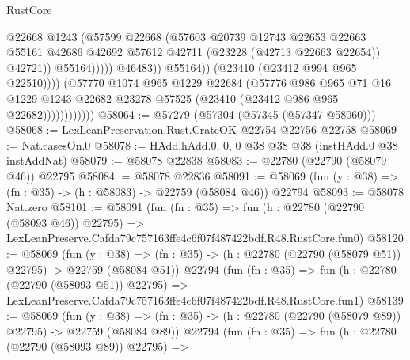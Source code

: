 \begin{lexlean}{RustCore}
\begin{coremodule}
                                          @22668
                                          @1243
                                          (@57599
                                            @22668
                                            (@57603
                                              @20739
                                              @12743
                                              @22653
                                              @22663
                                              @55161
                                              @42686
                                              @42692
                                              @57612
                                              @42711
                                              (@23228 (@42713 @22663 @22654))
                                              @42721))
                                          @55164)))))
                                @46483))
                            @55164))
                        (@23410 (@23412 @994 @965 @22510))))
                    (@57770
                      @1074
                      @965
                      @1229
                      @22684
                      (@57776
                        @986
                        @965
                        @71
                        @16
                        @1229
                        @1243
                        @22682
                        @23278
                        @57525
                        (@23410 (@23412 @986 @965 @22682))))))))))))
@58064 := @57279 (@57304 (@57345 (@57347 @58060)))
@58068 := LexLeanPreservation.Rust.CrateOK @22754 @22756 @22758
@58069 := Nat.casesOn.{0}
@58078 := HAdd.hAdd.{0, 0, 0} @38 @38 @38 (instHAdd.{0} @38 instAddNat)
@58079 := @58078 @22838
@58083 := @22780 (@22790 (@58079 @46)) @22795
@58084 := @58078 @22836
@58091 := @58069 (fun (y : @38) => (fn : @35) -> (h : @58083) -> @22759 (@58084 @46)) @22794
@58093 := @58078 Nat.zero
@58101 := @58091
    (fun (fn : @35) =>
    fun (h : @22780 (@22790 (@58093 @46)) @22795) =>
    LexLeanPreserve.Cafda79c757163ffe4c6f07f487422bdf.R48.RustCore.fun0)
@58120 := @58069
    (fun (y : @38) =>
    (fn : @35) -> (h : @22780 (@22790 (@58079 @51)) @22795) -> @22759 (@58084 @51))
    @22794
    (fun (fn : @35) =>
    fun (h : @22780 (@22790 (@58093 @51)) @22795) =>
    LexLeanPreserve.Cafda79c757163ffe4c6f07f487422bdf.R48.RustCore.fun1)
@58139 := @58069
    (fun (y : @38) =>
    (fn : @35) -> (h : @22780 (@22790 (@58079 @89)) @22795) -> @22759 (@58084 @89))
    @22794
    (fun (fn : @35) =>
    fun (h : @22780 (@22790 (@58093 @89)) @22795) =>

\end{coremodule}
\end{lexlean}
